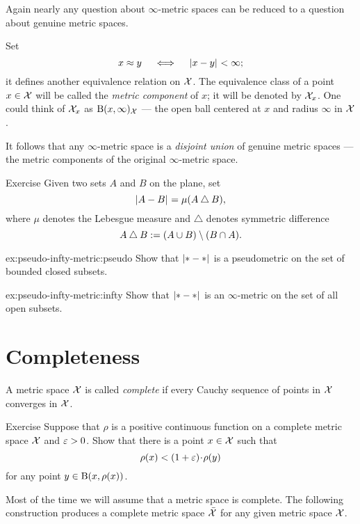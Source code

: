 Again nearly any question about $\infty$-metric spaces can be reduced to a question about genuine metric spaces. 

Set 
\[x\approx y\quad\iff\quad\dist{x}{y}{}<\infty;\]
it defines another equivalence relation on $\mathcal{X}$.
The equivalence class of a point $x\in\mathcal{X}$ will be called the \emph{metric component} 
 of $x$; it will be denoted by $\mathcal{X}_x$.
One could think of $\mathcal{X}_x$ as  $\mathrm{B}{}(x,\infty)_{\mathcal{X}}$ --- the open ball centered at $x$ and radius $\infty$ in $\mathcal{X}$.

It follows that any $\infty$-metric space is a {}\emph{disjoint union} of genuine metric spaces --- the metric components of the original $\infty$-metric space.

\begin{thm}{Exercise}\label{ex:pseudo-infty-metric}
Given two sets $A$ and $B$ on the plane, set 
\[\dist{A}{B}{}=\mu(A\bigtriangleup B),\]
where $\mu$ denotes the Lebesgue measure and $\bigtriangleup$ denotes symmetric difference
\[A\bigtriangleup B\mathrel{:=}(A\cup B)\setminus(B\cap A).\]

\begin{subthm}{ex:pseudo-infty-metric:pseudo}
Show that $\dist{*}{*}{}$ is a pseudometric on the set of bounded closed subsets.
\end{subthm}

\begin{subthm}{ex:pseudo-infty-metric:infty}
Show that $\dist{*}{*}{}$ is an $\infty$-metric on the set of all open subsets.
\end{subthm}
\end{thm}

\section{Completeness}

A metric space $\mathcal{X}$ is called \emph{complete} if every Cauchy sequence of points in $\mathcal{X}$ converges in $\mathcal{X}$.

\begin{thm}{Exercise}\label{ex:almost-min}
Suppose that $\rho$ is a positive continuous function on a complete metric space $\mathcal{X}$ and $\varepsilon>0$.
Show that there is a point $x\in \mathcal{X}$ such that 
\[\rho(x)<(1+\eps)\cdot\rho(y)\]
for any point $y\in \mathrm{B}{}(x,\rho(x))$.
\end{thm}

Most of the time we will assume that a metric space is complete.
The following construction produces a complete metric space $\bar{\mathcal{X}}$ for any given metric space $\mathcal{X}$.


